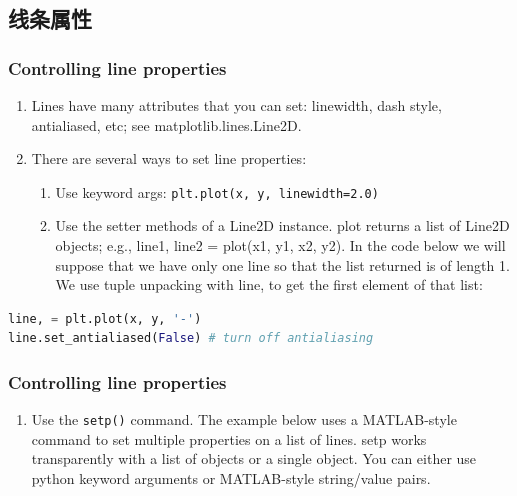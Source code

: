 \documentclass[UTF8,a4paper,12pt]{ctexart}  %
\providecommand{\tightlist}{\setlength{\itemsep}{0pt}\setlength{\parskip}{0pt}}
\newcommand{\passthrough}[1]{\lstset{mathescape=false}#1\lstset{mathescape=true}}
\begin{document}
\hypertarget{ux7ebfux6761ux5c5eux6027}{%
\subsection{线条属性}\label{ux7ebfux6761ux5c5eux6027}}

\hypertarget{controlling-line-properties}{%
\subsubsection{Controlling line properties}\label{controlling-line-properties}}

\begin{enumerate}
\def\labelenumi{\arabic{enumi}.}
\tightlist
\item
  Lines have many attributes that you can set: linewidth, dash style,
  antialiased, etc; see matplotlib.lines.Line2D.
\item
  There are several ways to set line properties:

  \begin{enumerate}
  \def\labelenumii{\arabic{enumii}.}
  \tightlist
  \item
    Use keyword args: \passthrough{\lstinline!plt.plot(x, y, linewidth=2.0)!}
  \item
    Use the setter methods of a Line2D instance. plot returns a list
    of Line2D objects; e.g., line1, line2 = plot(x1, y1, x2, y2). In
    the code below we will suppose that we have only one line so
    that the list returned is of length 1. We use tuple unpacking
    with line, to get the first element of that list:
  \end{enumerate}
\end{enumerate}

\begin{lstlisting}[language=Python]
line, = plt.plot(x, y, '-')
line.set_antialiased(False) # turn off antialiasing
\end{lstlisting}

\hypertarget{controlling-line-properties-1}{%
\subsubsection{Controlling line properties}\label{controlling-line-properties-1}}

\begin{enumerate}
\def\labelenumi{\arabic{enumi}.}
\tightlist
\item
  Use the \passthrough{\lstinline!setp()!} command. The example below uses a MATLAB-style
  command to set multiple properties on a list of lines. setp works
  transparently with a list of objects or a single object. You can
  either use python keyword arguments or MATLAB-style string/value
  pairs.
\end{enumerate}
\end{document}
